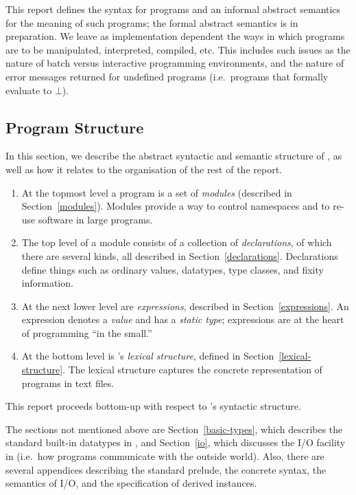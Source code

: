 This report defines the syntax for \Haskell{} programs and an
informal abstract semantics for the meaning of such
programs; the formal abstract semantics is in preparation.%
We leave as implementation
dependent the ways in which \Haskell{} programs are to be
manipulated, interpreted, compiled, etc.  This includes such issues as
the nature of batch versus interactive programming environments, and
the nature of error messages returned for undefined programs
(i.e.~programs that formally evaluate to $\bot$).

\subsection{Program Structure}
\label{programs}

In this section, we describe the abstract syntactic and semantic structure of
\Haskell{}, as well as how it relates to the organisation of the
rest of the report.
\begin{enumerate}
\item At the topmost level a \Haskell{} program is a set
of {\em modules} (described in Section~\ref{modules}).  Modules provide
a way to control namespaces
and to re-use software in large programs.

\item The top level of a module consists of a collection of
{\em declarations}, of which there are several kinds, all described
in Section~\ref{declarations}.  Declarations
define things such as ordinary values, datatypes, type
classes, and fixity information.

\item At the next lower level are {\em expressions}, described
in Section~\ref{expressions}.  An expression denotes a {\em value}
and has a {\em static type}; expressions are at the heart of
\Haskell{} programming ``in the small.''

\item At the bottom level is \Haskell{}'s {\em
lexical structure}, defined in Section~\ref{lexical-structure}.  The
lexical structure captures the concrete
representation of \Haskell{} programs in text files.

\end{enumerate}
This report proceeds bottom-up with respect
to \Haskell{}'s syntactic structure.

The sections not mentioned above are Section~\ref{basic-types}, which
describes the standard built-in datatypes in \Haskell{}, and
Section~\ref{io}, which discusses the I/O facility in \Haskell{}
(i.e.~how \Haskell{} programs communicate with the outside world).
Also, there are several appendices describing the
standard prelude, the
concrete syntax,
the semantics of I/O,
and the specification of derived instances.

